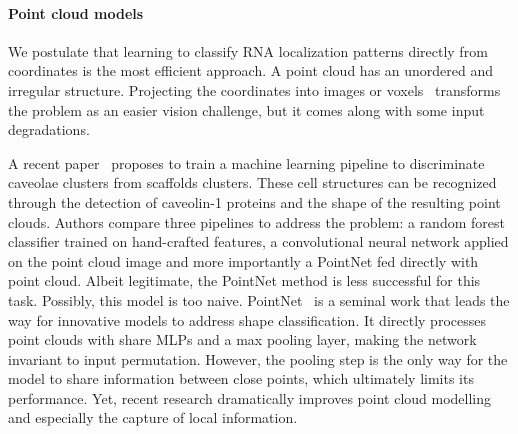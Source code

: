 
\paragraph{Point cloud models}

We postulate that learning to classify \ac{RNA} localization patterns directly from coordinates is the most efficient approach.
A point cloud has an unordered and irregular structure.
Projecting the coordinates into images or voxels~\cite{Maturana_2015} transforms the problem as an easier vision challenge, but it comes along with some input degradations.

A recent paper~\cite{khater_caveolae_2019} proposes to train a machine learning pipeline to discriminate caveolae clusters from scaffolds clusters.
These cell structures can be recognized through the detection of caveolin-1 proteins and the shape of the resulting point clouds.
Authors compare three pipelines to address the problem: a random forest classifier trained on hand-crafted features, a convolutional neural network applied on the point cloud image and more importantly a PointNet fed directly with point cloud.
Albeit legitimate, the PointNet method is less successful for this task.
Possibly, this model is too naive.
PointNet~\cite{Qi_2017_CVPR} is a seminal work that leads the way for innovative models to address shape classification.
It directly processes point clouds with share MLPs and a max pooling layer, making the network invariant to input permutation.
However, the pooling step is the only way for the model to share information between close points, which ultimately limits its performance.
Yet, recent research dramatically improves point cloud modelling and especially the capture of local information.

